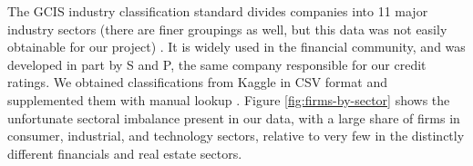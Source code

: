 \documentclass{article}[11pt]
\begin{document}
    The GCIS industry classification standard divides companies into 11 major industry sectors (there are finer groupings as well, but this data was not easily obtainable for our project) \citep{s_and_p_gics_2024}. It is widely used in the financial community, and was developed in part by S and P, the same company responsible for our credit ratings. We obtained classifications from Kaggle in CSV format and supplemented them with manual lookup \citep{kozlov_us_2022}. Figure \ref{fig:firms-by-sector} shows the unfortunate sectoral imbalance present in our data, with a large share of firms in consumer, industrial, and technology sectors, relative to very few in the distinctly different financials and real estate sectors.

\end{document}
